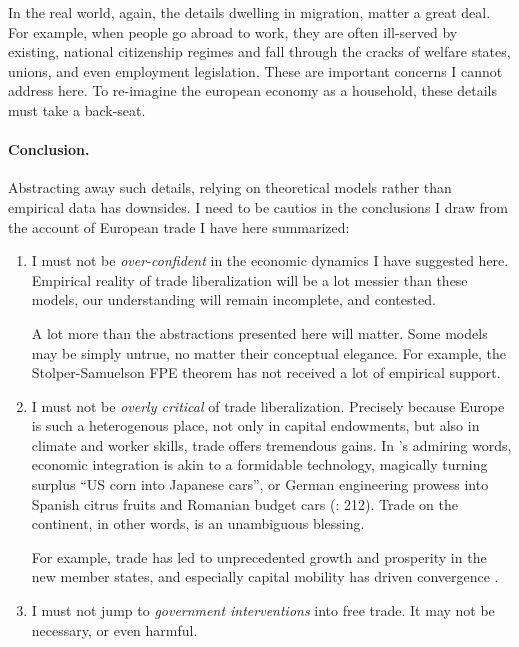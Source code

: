 \documentclass[11pt,a4paper,oneside,openright]{article}
\begin{document}
In the real world, again, the details dwelling in migration, matter a great deal. 
For example, when people go abroad to work, they are often ill-served by existing, national citizenship regimes and fall through the cracks of welfare states, unions, and even employment legislation. 
These are important concerns I cannot address here. 
To re-imagine the european economy as a household, these details must take a back-seat.

\paragraph{Conclusion.} Abstracting away such details, relying on theoretical models rather than empirical data has downsides. 
I need to be cautios in the conclusions I draw from the account of European trade I have here summarized: 
\begin{enumerate}
	\item I must not be \emph{over-confident} in the economic dynamics I have suggested here. 
	Empirical reality of trade liberalization will be a lot messier than these models, our understanding will remain incomplete, and contested. 
	
	A lot more than the abstractions presented here will matter. 
	Some models may  be simply untrue, no matter their conceptual elegance. 
	For example, the Stolper-Samuelson \gls{FPE} theorem has not received a lot of empirical support. 
	
	\item I must not be \emph{overly critical} of trade liberalization. 
	Precisely because Europe is such a heterogenous place, not only in capital endowments, but also in climate and worker skills, trade offers tremendous gains. 
	In \citeauthor{Mankiw-2004-aa}'s admiring words, economic integration is akin to a formidable technology, magically turning surplus ``US corn into Japanese cars'', or German engineering prowess into Spanish citrus fruits and Romanian budget cars (\citeyear{Mankiw-2004-aa}: 212). 
	Trade on the continent, in other words, is an unambiguous blessing. 
	
	For example, trade has led to unprecedented growth and prosperity in the new member states, and especially capital mobility has driven convergence \citep{Abiad2007}. %
	
	\item I must not jump to \emph{government interventions} into free trade. 
	It may not be necessary, or even harmful.
	

\end{enumerate}
\end{document}
